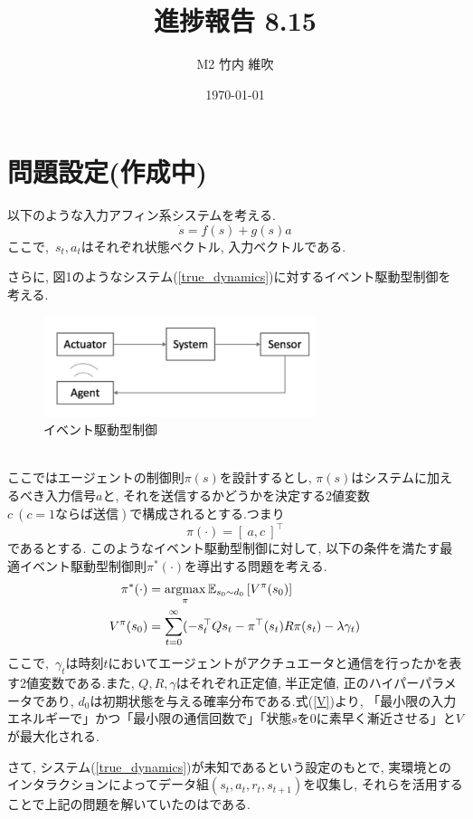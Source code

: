 \documentclass{jsarticle}
\title{\large{\bf{進捗報告 8.15}}}
\author{M2 竹内 維吹}
\date{\today}
\newcommand{\argmax}{\mathop{\rm argmax}\limits}
\newcommand{\expect}{\mathbb{E}}
\begin{document}
\maketitle


\section{問題設定(作成中)}
以下のような入力アフィン系システムを考える.
\begin{equation}
	\dot{s}=f(s)+g(s)a \label{true_dynamics}
\end{equation}
ここで,~$s_t, a_t$はそれぞれ状態ベクトル, 入力ベクトルである.\par
さらに, 図1のようなシステム(\ref{true_dynamics})に対するイベント駆動型制御を考える.
\begin{figure}[h]
	\centering
 	\includegraphics[width=8cm]{event.png}
 	\caption{イベント駆動型制御}
\end{figure}\\
ここではエージェントの制御則$\pi(s)$を設計するとし, $\pi(s)$はシステムに加えるべき入力信号$a$と, それを送信するかどうかを決定する2値変数$c~(c = 1 ならば送信)$で構成されるとする.つまり
\begin{equation}
	\pi(\cdot) = [~a, c~]^{\top}
\end{equation}
であるとする. このようなイベント駆動型制御に対して, 以下の条件を満たす最適イベント駆動型制御則$\pi^{*}(\cdot)$を導出する問題を考える.
\begin{align}
	\pi^{*}(\cdot) &= \argmax_{\pi}\expect_{s_0 \sim d_0}\left[V^{\pi} (s_0)\right] \label{optimal_policy}\\
	V^{\pi} (s_0) &=\sum_{t=0}^{\infty}(-s_t^{\top}Qs_t - \pi^{\top}(s_t)R\pi(s_t) - \lambda\gamma_t) \label{V}
\end{align}
ここで,~$\gamma_t$は時刻$t$においてエージェントがアクチュエータと通信を行ったかを表す2値変数である.また, $Q,R,\gamma$はそれぞれ正定値, 半正定値, 正のハイパーパラメータであり, $d_0$は初期状態を与える確率分布である.式(\ref{V})より, 「最小限の入力エネルギーで」かつ「最小限の通信回数で」「状態$s$を0に素早く漸近させる」と$V$が最大化される.\par
さて, システム(\ref{true_dynamics})が未知であるという設定のもとで, 実環境とのインタラクションによってデータ組$(s_t, a_t, r_t, s_{t+1})$を収集し, それらを活用することで上記の問題を解いていたのは\cite{event}である.\par
\end{document}
